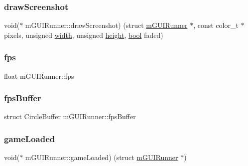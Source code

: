 \subsubsection{\texorpdfstring{draw\+Screenshot}{drawScreenshot}}
{\footnotesize\ttfamily void($\ast$ m\+G\+U\+I\+Runner\+::draw\+Screenshot) (struct \mbox{\hyperlink{structm_g_u_i_runner}{m\+G\+U\+I\+Runner}} $\ast$, const color\+\_\+t $\ast$pixels, unsigned \mbox{\hyperlink{readppm_8c_a59b7c57bf1dc7c36ac7c8232cf5bb713}{width}}, unsigned \mbox{\hyperlink{readppm_8c_ac8b624a7354198da45f5797b93b883c9}{height}}, \mbox{\hyperlink{libretro_8h_a4a26dcae73fb7e1528214a068aca317e}{bool}} faded)}

\mbox{\label{structm_g_u_i_runner_a70d52f6a42123a481384cca59dbdbaf3}} 
\subsubsection{\texorpdfstring{fps}{fps}}
{\footnotesize\ttfamily float m\+G\+U\+I\+Runner\+::fps}

\mbox{\label{structm_g_u_i_runner_acf90aa75c0f883cd92a625fab75550eb}} 
\subsubsection{\texorpdfstring{fps\+Buffer}{fpsBuffer}}
{\footnotesize\ttfamily struct Circle\+Buffer m\+G\+U\+I\+Runner\+::fps\+Buffer}

\mbox{\label{structm_g_u_i_runner_a4cb42f35a358fed8feb6b343299e3c7a}} 
\subsubsection{\texorpdfstring{game\+Loaded}{gameLoaded}}
{\footnotesize\ttfamily void($\ast$ m\+G\+U\+I\+Runner\+::game\+Loaded) (struct \mbox{\hyperlink{structm_g_u_i_runner}{m\+G\+U\+I\+Runner}} $\ast$)}

\mbox{\label{structm_g_u_i_runner_aa40d49395dff47f3cb5f45e1c25d8bb8}} 
